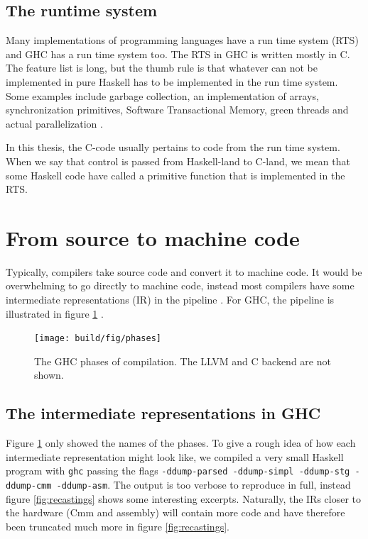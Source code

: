 \subsection{The runtime system}

Many implementations of programming languages have a run time system
(RTS) and GHC has a run time system too. The RTS in GHC is written
mostly in C. The feature list is long, but the thumb rule is that
whatever can not be implemented in pure Haskell has to be implemented
in the run time system. Some examples include garbage collection,
an implementation of arrays, synchronization primitives, Software
Transactional Memory, green threads and actual parallelization
\cite{commentary_rts}.

In this thesis, the C-code usually pertains to code from the run time
system. When we say that control is passed from Haskell-land to C-land,
we mean that some Haskell code have called a primitive function that is
implemented in the RTS.

\section{From source to machine code}

Typically, compilers take source code and convert it to machine code.
It would be overwhelming to go directly to machine code, instead most
compilers have some intermediate representations (IR) in the pipeline \cite[p.358]{aho2007compilers}.  For GHC, the pipeline is illustrated in
figure \ref{fig:ghc_phases} \cite{terei2009low}.

\begin{figure}
\begin{mdframed}
  \centering
  \texttt{[image: build/fig/phases]}
  \caption{The GHC phases of compilation. The LLVM and C backend are not
shown.}\label{fig:ghc_phases}
\end{mdframed}
\end{figure}

\subsection{The intermediate representations in GHC}

Figure \ref{fig:ghc_phases} only showed the names of the phases. To
give a rough idea of how each intermediate representation might look
like, we compiled a very small Haskell program with \texttt{ghc} passing
the flags \texttt{-ddump-parsed -ddump-simpl -ddump-stg
-ddump-cmm -ddump-asm}. The output is too verbose to reproduce in
full, instead figure \ref{fig:recastings} shows some interesting excerpts. Naturally, the
IRs closer to the hardware (Cmm and assembly) will contain more
code and have therefore been truncated much more in figure
\ref{fig:recastings}.

